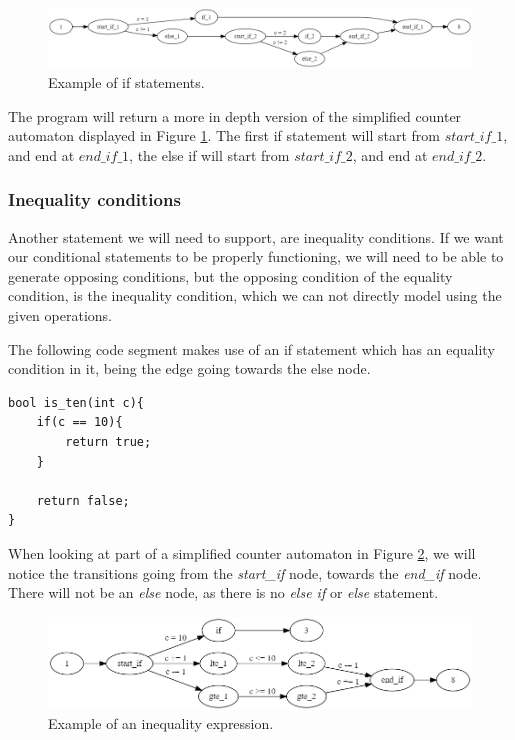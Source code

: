 \documentclass[12pt]{article}
\begin{document}
\begin{figure}[h]
	\centering
	\includegraphics[width=\linewidth]{test2_counter_automaton}
	\caption{Example of if statements.}
	\label{fig:test2_counter_automaton}
\end{figure}

The program will return a more in depth version of the simplified counter automaton displayed in Figure \ref{fig:test2_counter_automaton}. The first if statement will start from $start\_if\_1$, and end at $end\_if\_1$, the else if will start from $start\_if\_2$, and end at $end\_if\_2$.

\subsubsection{Inequality conditions}
\label{sec:inequality}
Another statement we will need to support, are inequality conditions. If we want our conditional statements to be properly functioning, we will need to be able to generate opposing conditions, but the opposing condition of the equality condition, is the inequality condition, which we can not directly model using the given operations.

The following code segment makes use of an if statement which has an equality condition in it, being the edge going towards the else node.

\begin{lstlisting}[style=CStyle]
bool is_ten(int c){
	if(c == 10){
		return true;
	}
	
	return false;
}
\end{lstlisting}

When looking at part of a simplified counter automaton in Figure \ref{fig:inequality_expression}, we will notice the transitions going from the \textit{start\_if} node, towards the \textit{end\_if} node. There will not be an \textit{else} node, as there is no \textit{else if} or \textit{else} statement.

\begin{figure}[h]
	\centering
	\includegraphics[width=\linewidth]{inequality_expression}
	\caption{Example of an inequality expression.}
	\label{fig:inequality_expression}
\end{figure}
\end{document}
